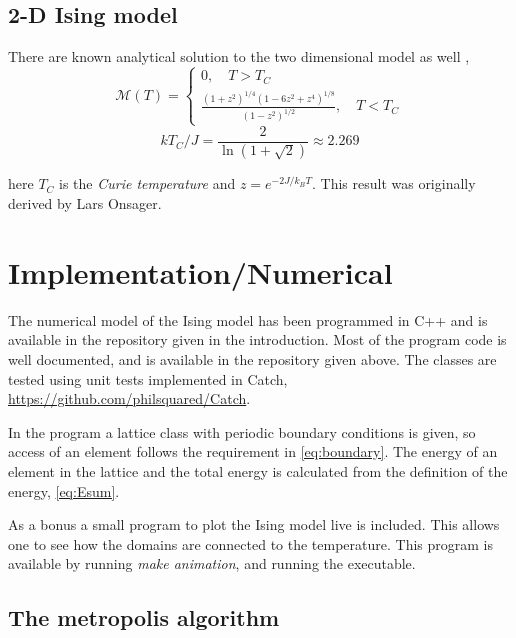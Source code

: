 \documentclass[11pt,a4paper,final]{article}
\numberwithin{equation}{section}
\newcommand{\magM}{\mathcal{M}}
\begin{document}
\subsection{2-D Ising model}
There are known analytical solution to the two dimensional model
as well \cite{KH87},
\begin{equation}
\magM (T) = \begin{cases} 0, \quad T > T_C \\ \frac{(1+z^2)^{1/4} (1-6z^2 + z^4 )^{1/8} }{(1-z^2)^{1/2}}, \quad T < T_C \end{cases}
\end{equation}
\begin{equation}
k T_C/J = \frac{2}{\ln(1+ \sqrt{2}) } \approx 2.269
\end{equation}

here $T_C$ is the \emph{Curie temperature} and $z = e^{-2J/k_B T}$. This result was originally derived by Lars Onsager.

\section{Implementation/Numerical}

The numerical model of the Ising model has been programmed in C++ and is 
available in the repository given in the introduction.
Most of the program code is well documented, and is available in the 
repository given above. The classes are tested using unit tests 
implemented in Catch, \url{https://github.com/philsquared/Catch}.

In the program a lattice class with periodic boundary conditions is given,
so access of an element follows the requirement in \eqref{eq:boundary}.
The energy of an element in the 
lattice and the total energy is calculated from the definition
of the energy, \eqref{eq:Esum}.

As a bonus a small program to plot the Ising model live is included. 
This allows one to see how the domains are connected to the temperature.
This program is available by running \emph{make animation}, and running 
the executable.


\subsection{The metropolis algorithm}
\end{document}

